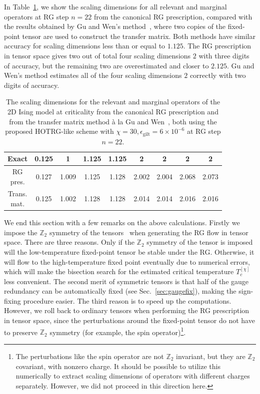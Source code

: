 \documentclass[aps,prr,reprint,superscriptaddress,nofootinbib,floatfix]{revtex4-2}
\begin{document}
In Table~\ref{table:scDim}, we show the scaling dimensions for all relevant and marginal operators at RG step $n = 22$ from the canonical RG prescription, compared with the results obtained by Gu and Wen's method~\cite{GuWen2009}, where two copies of the fixed-point tensor are used to construct the transfer matrix. 
Both methods have similar accuracy for scaling dimensions less than or equal to $1.125$.
The RG prescription in tensor space gives two out of total four scaling dimensions $2$ with three digits of accuracy, but the remaining two are overestimated and closer to $2.125$.
Gu and Wen's method estimates all of the four scaling dimensions $2$ correctly with two digits of accuracy.
%
\begin{table}[t]%
\caption{The scaling dimensions for the relevant and marginal operators
    of the 2D Ising model at criticality from the canonical RG prescription 
    and from the transfer matrix method \`a la Gu and
    Wen~\cite{GuWen2009}, both using the proposed HOTRG-like scheme with $\chi = 30, \epsilon_{\text{gilt}} =
    6\times 10^{-6}$ at RG step $n = 22$.\label{table:scDim}} 
\begin{ruledtabular}
\begin{tabular}{ c c c c c c c c c }
Exact      & 0.125 & 1 & 1.125 & 1.125 & 2 & 2 & 2 & 2 \\
\hline
\thead{RG\\ pres.} & 0.127 & 1.009 & 1.125 & 1.128 & 2.002 &
2.004 & 2.068 & 2.073 \\
\thead{Trans.\\ mat.} & 0.125 & 1.002 & 1.128 & 1.128 & 2.014 &
2.014 & 2.016 & 2.016
\end{tabular}
\end{ruledtabular}
\end{table}

We end this section with a few remarks on the above calculations. 
Firstly we impose the $\mathbb{Z}_2$ symmetry of the tensors~\cite{Singh2010SymTen, Singh2011U1Ten} when generating the RG flow in tensor space. 
There are three reasons. 
Only if the $\mathbb{Z}_2$ symmetry of the tensor is imposed will the low-temperature fixed-point tensor be stable under the RG.  
Otherwise, it will flow to the high-temperature fixed point eventually due to numerical errors, which will make the bisection search for the estimated critical temperature $T_c^{[\chi]}$ less convenient. 
The second merit of symmetric tensors is that half of the gauge redundancy can be automatically fixed (see Sec.~\ref{sec:gaugefix}), making the sign-fixing procedure easier. 
The third reason is to speed up the computations. 
However, we roll back to ordinary tensors when performing the RG prescription in tensor space, since the perturbations around the fixed-point tensor do not have to preserve $\mathbb{Z}_2$ symmetry (for example, the spin operator)\footnote{
    The perturbations like the spin operator are not $\mathbb{Z}_2$ invariant, but they are $\mathbb{Z}_2$ covariant, with nonzero charge. 
    It should be possible to utilize this numerically to extract scaling dimensions of operators with different charges separately.
    However, we did not proceed in this direction here.
}. 
%
\end{document}
